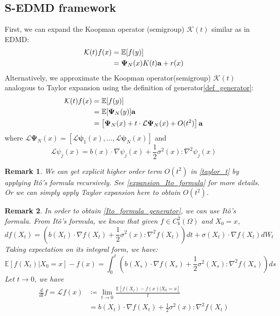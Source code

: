 \documentclass{article}[11]
\newtheorem*{remark}{Remark}
\begin{document}
	\subsection*{S-EDMD framework}
	First, we can expand the Koopman operator (semigroup) $\mathcal{K}(t)$ similar as in EDMD:
	\begin{align}\label{edmd_expansion}
		\mathcal{K}(t) f(x) 
		&= \mathbb{E}[f(y)] \notag\\
		&= \mathbf{\Psi}_N(x)K(t)\mathbf{a} + r(x) 
	\end{align}
	Alternatively, we approximate the Koopman operator(semigroup) $\mathcal{K}(t)$ analogous to Taylor expansion using the definition of generator\eqref{def_generator}:
	\begin{align}\label{taylor_t}
		\mathcal{K}(t)f(x) &= \mathbb{E}[f(y)] \notag\\
		&= \mathbb{E}[\mathbf{\Psi}_N(y)]\mathbf{a} \notag\\
		&= \left[ \mathbf{\Psi}_N(x) + t \cdot \mathcal{L}\mathbf{\Psi}_N(x) + O(t^2)  \right]\mathbf{a}
	\end{align}
	where $\mathcal{L}\mathbf{\Psi}_N(x) = \left[ \mathcal{L}\mathbf{\psi}_1(x), \dots, \mathcal{L}\mathbf{\psi}_N(x) \right]$ and
	\begin{equation}\label{Ito_formula_generator}
		\mathcal{L}\psi_j(x) = b(x)\cdot \nabla\psi_j(x) + \frac{1}{2}\sigma^2(x)\colon \nabla^2 \psi_j(x)
	\end{equation}
	\begin{remark}
		We can get explicit higher order term $O(t^2)$ in \eqref{taylor_t} by applying It\^{o}'s formula recursively. See \ref{expansion_Ito_formula} for more details. Or we can simply apply Taylor expansion here to obtain $O(t^2)$.
	\end{remark}
	\begin{remark}
		In order to obtain \eqref{Ito_formula_generator}, we can use It\^{o}'s formula. From It\^{o}'s formula, we know that given $f\in C_b^2(\Omega)$ and $X_0=x$,
		$$ df(X_t) = \left(b(X_t)\cdot \nabla f(X_t) + \frac{1}{2}\sigma^2(x)\colon \nabla^2 f(X_t)\right)dt + \sigma(X_t)\cdot \nabla f(X_t)dW_t $$
		Taking expectation on its integral form, we have: 
		$$\mathbb{E}[f(X_t)|X_0=x]-f(x) = \int_0^t \left( b(X_s)\cdot \nabla f(X_s) + \frac{1}{2}\sigma^2(X_s)\colon \nabla^2 f(X_s) \right) ds$$
		Let $t \to 0$, we have
		\begin{align*}
			\frac{d}{dt}f = \mathcal{L}f(x) &\coloneqq \lim_{t \to 0} \frac{\mathbb{E}[f(X_t)-f(x)|X_0=x]}{t} \\
			&= b(X_t)\cdot \nabla f(X_t) + \frac{1}{2}\sigma^2(x)\colon \nabla^2 f(X_t)
		\end{align*}
	\end{remark}
\end{document}

